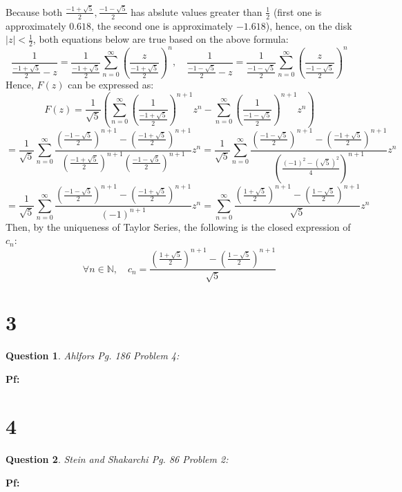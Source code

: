 \documentclass{article}
\newtheorem{question}{Question}
\begin{document}
Because both $\frac{-1+\sqrt{5}}{2},\frac{-1-\sqrt{5}}{2}$ has abslute values greater than $\frac{1}{2}$ (first one is approximately $0.618$, the second one is approximately $-1.618$),
hence, on the disk $|z|<\frac{1}{2}$, both equations below are true based on the above formula:
$$\frac{1}{\frac{-1+\sqrt{5}}{2}-z}=\frac{1}{\frac{-1+\sqrt{5}}{2}}\sum_{n=0}^{\infty}\left(\frac{z}{\frac{-1+\sqrt{5}}{2}}\right)^n,\quad \frac{1}{\frac{-1-\sqrt{5}}{2}-z}=\frac{1}{\frac{-1-\sqrt{5}}{2}}\sum_{n=0}^{\infty}\left(\frac{z}{\frac{-1-\sqrt{5}}{2}}\right)^n$$
Hence, $F(z)$ can be expressed as:
$$F(z)=\frac{1}{\sqrt{5}}\left(\sum_{n=0}^{\infty}\left(\frac{1}{\frac{-1+\sqrt{5}}{2}}\right)^{n+1}z^n-\sum_{n=0}^{\infty}\left(\frac{1}{\frac{-1-\sqrt{5}}{2}}\right)^{n+1}z^n\right)$$
$$=\frac{1}{\sqrt{5}}\sum_{n=0}^{\infty}\frac{\left(\frac{-1-\sqrt{5}}{2}\right)^{n+1}-\left(\frac{-1+\sqrt{5}}{2}\right)^{n+1}}{\left(\frac{-1+\sqrt{5}}{2}\right)^{n+1}\left(\frac{-1-\sqrt{5}}{2}\right)^{n+1}}z^n =\frac{1}{\sqrt{5}}\sum_{n=0}^{\infty}\frac{\left(\frac{-1-\sqrt{5}}{2}\right)^{n+1}-\left(\frac{-1+\sqrt{5}}{2}\right)^{n+1}}{\left(\frac{(-1)^2-(\sqrt{5})^2}{4}\right)^{n+1}}z^n$$
$$=\frac{1}{\sqrt{5}}\sum_{n=0}^{\infty}\frac{\left(\frac{-1-\sqrt{5}}{2}\right)^{n+1}-\left(\frac{-1+\sqrt{5}}{2}\right)^{n+1}}{(-1)^{n+1}}z^n = \sum_{n=0}^{\infty}\frac{\left(\frac{1+\sqrt{5}}{2}\right)^{n+1}-\left(\frac{1-\sqrt{5}}{2}\right)^{n+1}}{\sqrt{5}}z^n$$
Then, by the uniqueness of Taylor Series, the following is the closed expression of $c_n$:
$$\forall n\in\mathbb{N},\quad c_n=\frac{\left(\frac{1+\sqrt{5}}{2}\right)^{n+1}-\left(\frac{1-\sqrt{5}}{2}\right)^{n+1}}{\sqrt{5}}$$

\break

\section*{3}
\begin{myBox}[]{}
    \begin{question}
        Ahlfors Pg. 186 Problem 4:
    \end{question}
\end{myBox}

\textbf{Pf:}

\break

\section*{4}
\begin{myBox}[]{}
    \begin{question}
        Stein and Shakarchi Pg. 86 Problem 2:
    \end{question}
\end{myBox}

\textbf{Pf:}
\end{document}
